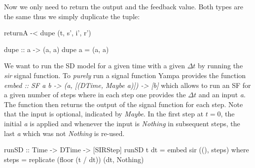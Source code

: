 Now we only need to return the output and the feedback value. Both types are the same thus we simply duplicate the tuple:

\begin{HaskellCode}
      returnA -< dupe (t, s', i', r')

    dupe :: a -> (a, a)
    dupe a = (a, a)
\end{HaskellCode}

We want to run the SD model for a given time with a given $\Delta t$ by running the \textit{sir} signal function. To \textit{purely} run a signal function Yampa provides the function \textit{embed :: SF a b -> (a, [(DTime, Maybe a)]) -> [b]} which allows to run an SF for a given number of steps where in each step one provides the $\Delta t$ and an input \textit{a}. The function then returns the output of the signal function for each step. Note that the input is optional, indicated by \textit{Maybe}. In the first step at $t = 0$, the initial \textit{a} is applied and whenever the input is \textit{Nothing} in subsequent steps, the last \textit{a} which was not \textit{Nothing} is re-used.

\begin{HaskellCode}
runSD :: Time -> DTime -> [SIRStep]
runSD t dt = embed sir ((), steps)
  where
    steps = replicate (floor (t / dt)) (dt, Nothing)
\end{HaskellCode}
